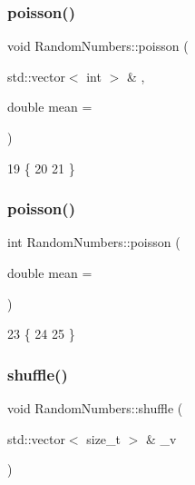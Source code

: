 \subsubsection{\texorpdfstring{poisson()}{poisson()}\hspace{0.1cm}{\footnotesize\ttfamily [1/2]}}
{\footnotesize\ttfamily void Random\+Numbers\+::poisson (\begin{DoxyParamCaption}\item[{std\+::vector$<$ int $>$ \&}]{,  }\item[{double}]{mean = {} }\end{DoxyParamCaption})}


\begin{DoxyCode}
19                                                           \{
20     
21 \}
\end{DoxyCode}
\mbox{\label{classRandomNumbers_ac5bd95dddabde62a74a0d871a66ce2f0}} 
\subsubsection{\texorpdfstring{poisson()}{poisson()}\hspace{0.1cm}{\footnotesize\ttfamily [2/2]}}
{\footnotesize\ttfamily int Random\+Numbers\+::poisson (\begin{DoxyParamCaption}\item[{double}]{mean = {} }\end{DoxyParamCaption})}


\begin{DoxyCode}
23                                         \{
24     
25 \}
\end{DoxyCode}
\mbox{\label{classRandomNumbers_a851aaa7e46922dc22ce984b21b474a4e}} 
\subsubsection{\texorpdfstring{shuffle()}{shuffle()}}
{\footnotesize\ttfamily void Random\+Numbers\+::shuffle (\begin{DoxyParamCaption}\item[{std\+::vector$<$ size\+\_\+t $>$ \&}]{\+\_\+v }\end{DoxyParamCaption})\hspace{0.3cm}{\ttfamily [inline]}}


